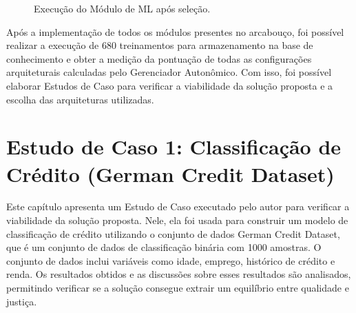 \documentclass[portugues]{ic-tese}
\begin{document}
\begin{figure}[H]
    \centering
    \caption{Execução do Módulo de ML após seleção.}
    \label{fig:pipelineAutonomoResultado}
\end{figure}

Após a implementação de todos os módulos presentes no arcabouço, foi possível realizar a execução de 680 treinamentos para armazenamento na base de conhecimento e obter a medição da pontuação de todas as configurações arquiteturais calculadas pelo Gerenciador Autonômico. Com isso, foi possível elaborar Estudos de Caso para verificar a viabilidade da solução proposta e a escolha das arquiteturas utilizadas.

\chapter{Estudo de Caso 1: Classificação de Crédito (German Credit Dataset)}

Este capítulo apresenta um Estudo de Caso executado pelo autor para verificar a viabilidade da solução proposta. Nele, ela foi usada para construir um modelo de classificação de crédito utilizando o conjunto de dados German Credit Dataset, que é um conjunto de dados de classificação binária com 1000 amostras. O conjunto de dados inclui variáveis como idade, emprego, histórico de crédito e renda. Os resultados obtidos e as discussões sobre esses resultados são analisados, permitindo verificar se a solução consegue extrair um equilíbrio entre qualidade e justiça.
\end{document}
